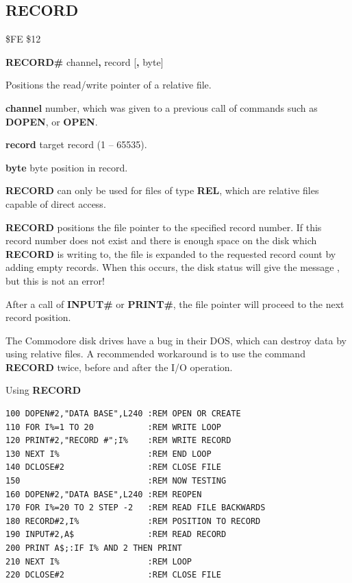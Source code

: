 
\newpage
\subsection{RECORD}
\begin{description}[leftmargin=2cm,style=nextline]
\item [Token:] \$FE \$12
\item [Format:] {\bf RECORD\#} channel{\bf,} record [{\bf,} byte]
\item [Usage:]  Positions the read/write pointer of a relative file.

                {\bf channel} number, which was given to a previous
                call of commands such as {\bf DOPEN}, or {\bf OPEN}.

                {\bf record} target record (1 -- 65535).

                {\bf byte} byte position in record.

                {\bf RECORD} can only be used for files of
                type {\bf REL}, which are relative files capable
                of direct access.

               {\bf RECORD} positions the file pointer
               to the specified record number. If this record number
               does not exist and there is enough space on the disk
               which {\bf RECORD} is writing to,
               the file is expanded to the requested record count by adding
               empty records. When this occurs, the disk
               status will give the message , but
               this is not an error!

               After a call of {\bf INPUT\#} or {\bf PRINT\#}, the file pointer will proceed
               to the next record position.

\item [Remarks:] The Commodore disk drives have a bug
               in their DOS, which can destroy data by using
               relative files. A recommended workaround is to
               use the command {\bf RECORD} twice, before
               and after the I/O operation.

\item [Example:] Using {\bf RECORD}
\begin{tcolorbox}[colback=black,coltext=white]
\verbatimfont{\codefont}
\begin{verbatim}
100 DOPEN#2,"DATA BASE",L240 :REM OPEN OR CREATE
110 FOR I%=1 TO 20           :REM WRITE LOOP
120 PRINT#2,"RECORD #";I%    :REM WRITE RECORD
130 NEXT I%                  :REM END LOOP
140 DCLOSE#2                 :REM CLOSE FILE
150                          :REM NOW TESTING
160 DOPEN#2,"DATA BASE",L240 :REM REOPEN
170 FOR I%=20 TO 2 STEP -2   :REM READ FILE BACKWARDS
180 RECORD#2,I%              :REM POSITION TO RECORD
190 INPUT#2,A$               :REM READ RECORD
200 PRINT A$;:IF I% AND 2 THEN PRINT
210 NEXT I%                  :REM LOOP
220 DCLOSE#2                 :REM CLOSE FILE


\end{verbatim}
\end{tcolorbox}
\end{description}
